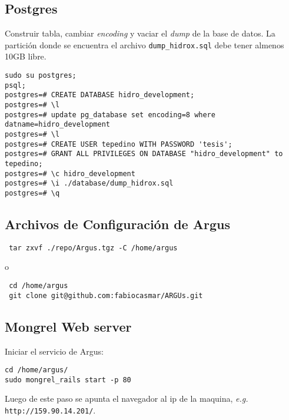 \documentclass[spanish,10pt]{article}
\begin{document}
\subsection{Postgres}
Construir tabla, cambiar \emph{encoding} y vaciar el \emph{dump} de la base de datos. La partición donde se encuentra el archivo 
\verb+dump_hidrox.sql+ debe tener almenos 10GB libre.
\begin{verbatim}
sudo su postgres; 
psql;
postgres=# CREATE DATABASE hidro_development;
postgres=# \l
postgres=# update pg_database set encoding=8 where datname=hidro_development
postgres=# \l
postgres=# CREATE USER tepedino WITH PASSWORD 'tesis';
postgres=# GRANT ALL PRIVILEGES ON DATABASE "hidro_development" to tepedino;
postgres=# \c hidro_development
postgres=# \i ./database/dump_hidrox.sql
postgres=# \q
\end{verbatim}
\subsection{Archivos de Configuración de Argus}
\begin{verbatim}
 tar zxvf ./repo/Argus.tgz -C /home/argus
\end{verbatim}
o
\begin{verbatim}
 cd /home/argus
 git clone git@github.com:fabiocasmar/ARGUs.git
\end{verbatim}
\subsection{Mongrel Web server}
Iniciar el servicio de Argus: 
\begin{verbatim}
cd /home/argus/
sudo mongrel_rails start -p 80
\end{verbatim}
Luego de este paso se apunta el navegador al ip de la maquina, \emph{e.g.} \texttt{http://159.90.14.201/}.
\end{document}

